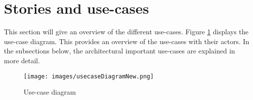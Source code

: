 

\clearpage


\section{Stories and use-cases}
This section will give an overview of the different use-cases. Figure \ref{fig:usecase-diagram} displays the use-case diagram. This provides an overview of the use-cases with their actors. In the subsections below, the architectural important use-cases are explained in more detail.

\begin{figure}[h]
\centering
\texttt{[image: images/usecaseDiagramNew.png]}
\caption{Use-case diagram}
\label{fig:usecase-diagram}
\end{figure}




